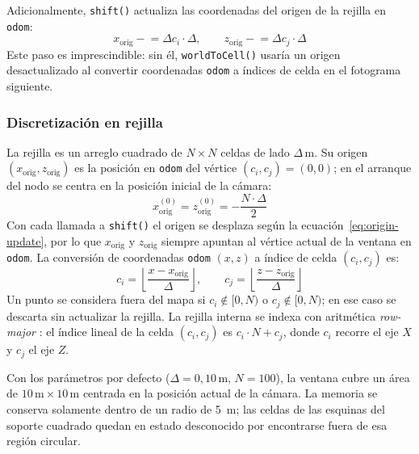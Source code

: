 Adicionalmente, \texttt{shift()} actualiza las coordenadas del origen de la
rejilla en \texttt{odom}:
%
\begin{equation}
  \label{eq:origin-update}
  x_{\text{orig}} \mathrel{-}= \Delta c_i \cdot \Delta,
  \qquad
  z_{\text{orig}} \mathrel{-}= \Delta c_j \cdot \Delta
\end{equation}
%
Este paso es imprescindible: sin él, \texttt{worldToCell()} usaría un origen
desactualizado al convertir coordenadas \texttt{odom} a índices de celda en
el fotograma siguiente.

\subsubsection{Discretización en rejilla}
\label{subsubsec:lm-v5-rejilla}

La rejilla es un arreglo cuadrado de $N \times N$ celdas de lado $\Delta\,\text{m}$.
Su origen $(x_{\text{orig}}, z_{\text{orig}})$ es la posición en \texttt{odom}
del vértice $(c_i, c_j) = (0, 0)$; en el arranque del nodo se centra en la
posición inicial de la cámara:
%
\begin{equation}
  \label{eq:grid-origin}
  x_{\text{orig}}^{(0)} = z_{\text{orig}}^{(0)} = -\frac{N \cdot \Delta}{2}
\end{equation}
%
Con cada llamada a \texttt{shift()} el origen se desplaza según la
ecuación~\ref{eq:origin-update}, por lo que $x_{\text{orig}}$ y
$z_{\text{orig}}$ siempre apuntan al vértice actual de la ventana en
\texttt{odom}. La conversión de coordenadas \texttt{odom} $(x, z)$ a índice
de celda $(c_i, c_j)$ es:
%
\begin{equation}
  \label{eq:world-to-cell}
  c_i = \left\lfloor \frac{x - x_{\text{orig}}}{\Delta} \right\rfloor,
  \qquad
  c_j = \left\lfloor \frac{z - z_{\text{orig}}}{\Delta} \right\rfloor
\end{equation}
%
Un punto se considera fuera del mapa si $c_i \notin [0, N)$ o
$c_j \notin [0, N)$; en ese caso se descarta sin actualizar la rejilla.
La rejilla interna se indexa con aritmética \emph{row-major} \cite{stroustrup2013cpp}:
el índice lineal de la celda $(c_i, c_j)$ es $c_i \cdot N + c_j$, donde
$c_i$ recorre el eje $X$ y $c_j$ el eje $Z$.

Con los parámetros por defecto ($\Delta = 0{,}10\,\text{m}$, $N = 100$), la
ventana cubre un área de $10\,\text{m} \times 10\,\text{m}$ centrada en la
posición actual de la cámara. La memoria se conserva solamente dentro de un
radio de 5~m; las celdas de las esquinas del soporte cuadrado quedan en estado
desconocido por encontrarse fuera de esa región circular.


